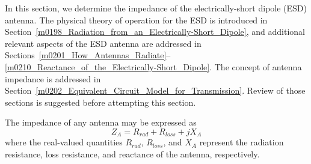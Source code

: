 

\label{m0204_The_Electrically-Short_Dipole} %

In this section, we determine the impedance of the electrically-short dipole (ESD) antenna.  
The physical theory of operation for the ESD is introduced in Section~\ref{m0198_Radiation_from_an_Electrically-Short_Dipole}, and additional relevant aspects of the ESD antenna are addressed in Sections~\ref{m0201_How_Antennas_Radiate}--\ref{m0210_Reactance_of_the_Electrically-Short_Dipole}. 
The concept of antenna impedance is addressed in Section~\ref{m0202_Equivalent_Circuit_Model_for_Transmission}.
Review of those sections is suggested before attempting this section.

The impedance of any antenna may be expressed as
%
\begin{equation}
Z_A = R_{rad} + R_{loss} +jX_A
\end{equation}
%
where the real-valued quantities $R_{rad}$, 
$R_{loss}$, and $X_A$ represent the radiation resistance, loss resistance, and reactance of the antenna, respectively.

